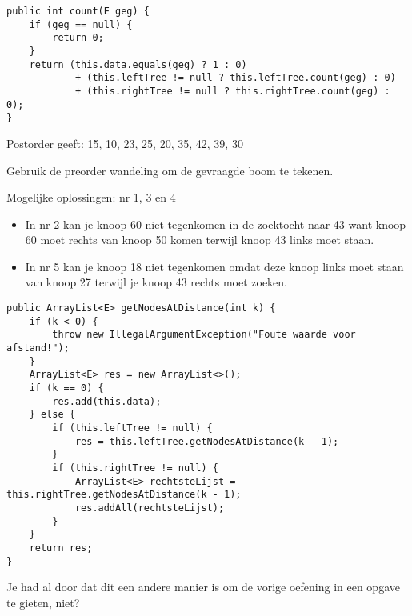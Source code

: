 \begin{Oplossing}{4.2}
\begin{lstlisting}[caption={count methode}, label=herhoefbbcount]
public int count(E geg) {
	if (geg == null) {
		return 0;
	}
	return (this.data.equals(geg) ? 1 : 0)
			+ (this.leftTree != null ? this.leftTree.count(geg) : 0)
			+ (this.rightTree != null ? this.rightTree.count(geg) : 0);
}
\end{lstlisting}
\end{Oplossing}
\begin{Oplossing}{4.3}
Postorder geeft: 15, 10, 23, 25, 20, 35, 42, 39, 30

Gebruik de preorder wandeling om de gevraagde boom te tekenen.
\end{Oplossing}
\begin{Oplossing}{4.4}
Mogelijke oplossingen: nr 1, 3 en 4
\begin{itemize}
\item In nr 2 kan je knoop 60 niet tegenkomen in de zoektocht naar 43 want knoop 60 moet rechts van knoop 50 komen terwijl knoop 43 links moet staan.
\item In nr 5 kan je knoop 18 niet tegenkomen omdat deze knoop links moet staan van knoop 27 terwijl je knoop 43 rechts moet zoeken.
\end{itemize}
\end{Oplossing}
\begin{Oplossing}{4.5}
\begin{lstlisting}[caption={getNodesAtDistance(k) methode}, label=herhoefbbdistance]
public ArrayList<E> getNodesAtDistance(int k) {
	if (k < 0) {
		throw new IllegalArgumentException("Foute waarde voor afstand!");
	}
	ArrayList<E> res = new ArrayList<>();
	if (k == 0) {
		res.add(this.data);
	} else {
		if (this.leftTree != null) {
			res = this.leftTree.getNodesAtDistance(k - 1);
		}
		if (this.rightTree != null) {
			ArrayList<E> rechtsteLijst = this.rightTree.getNodesAtDistance(k - 1);
			res.addAll(rechtsteLijst);
		}
	}
	return res;
}
\end{lstlisting}
\end{Oplossing}
\begin{Oplossing}{4.6}
Je had al door dat dit een andere manier is om de vorige oefening in een opgave te gieten, niet?
\end{Oplossing}
